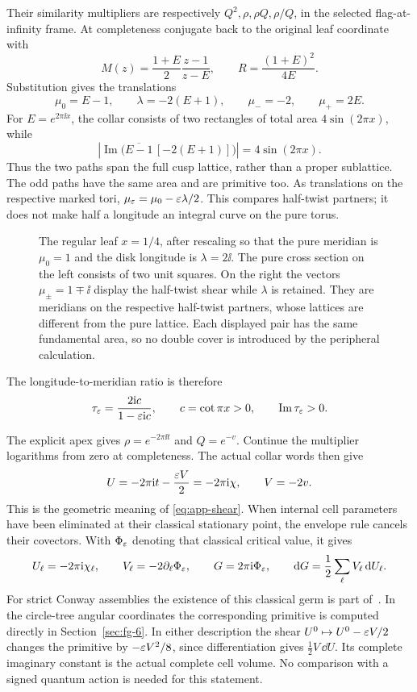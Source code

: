 Their similarity multipliers are respectively
\(Q^2,\rho,\rho Q,\rho/Q\), in the selected flag-at-infinity frame.
At completeness conjugate back to the original leaf coordinate with
\[
 M(z)=\frac{1+E}{2}\frac{z-1}{z-E},\qquad
 R=\frac{(1+E)^2}{4E}.
\]
Substitution gives the translations
\[
 \mu_0=E-1,\qquad \lambda=-2(E+1),\qquad
 \mu_-=-2,\qquad \mu_+=2E.
\]
For \(E=e^{2\pi\ii x}\), the collar consists of two rectangles of
total area \(4\sin(2\pi x)\), while
\[
 \left|\operatorname{Im}
       \bigl(\overline{E-1}\,[-2(E+1)]\bigr)\right|
                  =4\sin(2\pi x).
\]
Thus the two paths span the full cusp lattice, rather than a proper
sublattice. The odd paths have the same area and are primitive too.
As translations on the respective marked tori,
\(\mu_\varepsilon=\mu_0-\varepsilon\lambda/2\). This compares half-twist partners;
it does not make half a longitude an integral curve on the pure torus.
\begin{figure}[ht]
\centering
\caption{The regular leaf $x=1/4$, after rescaling so that the pure
meridian is $\mu_0=1$ and the disk longitude is $\lambda=2\ii$.
The pure cross section on the left consists of two unit squares.
On the right the vectors $\mu_\pm=1\mp\ii$ display the half-twist
shear while $\lambda$ is retained. They are meridians on the respective
half-twist partners, whose lattices are different from the pure lattice.
Each displayed pair has the same fundamental area, so no double cover
is introduced by the peripheral calculation.}
\label{fig:primitive-cusp-basis}
\end{figure}

The longitude-to-meridian ratio is therefore
\[
 \tau_\varepsilon=\frac{2\mathrm i c}{1-\varepsilon\mathrm i c},\qquad
 c=\cot\pi x>0,\qquad \operatorname{Im}\tau_\varepsilon>0.
\]

The explicit apex gives \(\rho=e^{-2\pi\ii t}\) and \(Q=e^{-v}\).
Continue the multiplier logarithms from zero at completeness. The
actual collar words then give
\[
 U=-2\pi\mathrm i t-\frac{\varepsilon V}{2}=-2\pi\mathrm i\chi,
 \qquad V=-2v.
\]
This is the geometric meaning of \eqref{eq:app-shear}. When internal
cell parameters have been eliminated at their classical stationary
point, the envelope rule cancels their covectors. With \(\Phi_\varepsilon\)
denoting that classical critical value, it gives
\begin{equation}\label{eq:app-primitive}
 U_\ell=-2\pi\mathrm i\chi_\ell,\qquad
 V_\ell=-2\partial_\ell\Phi_\varepsilon,\qquad
 G=2\pi\mathrm i\Phi_\varepsilon,\qquad
 \mathrm d G=\frac12\sum_\ell V_\ell\,\mathrm d U_\ell.
\end{equation}
For strict Conway assemblies the existence of this classical germ is
part of~\cite[Theorem~1.3]{StrictGeometry}. In the circle-tree angular
coordinates the corresponding primitive is computed directly in
Section~\ref{sec:fg-6}. In either description the shear
\(U^0\mapsto U^0-\varepsilon V/2\) changes the primitive by
\(-\varepsilon V^2/8\), since differentiation gives
\(\tfrac12 V\,\dd U\). Its complete imaginary constant is the actual
complete cell volume. No comparison with a signed quantum action is
needed for this statement.

